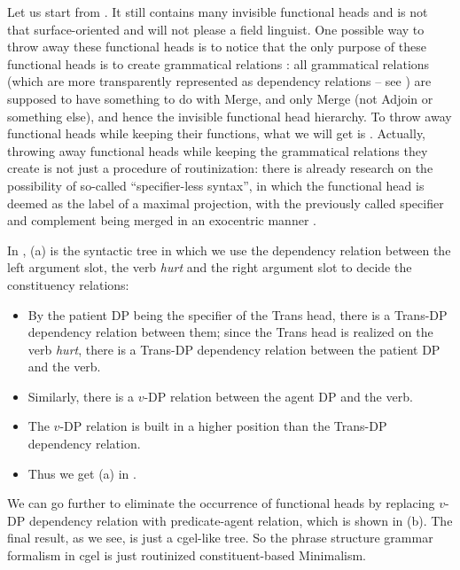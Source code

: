 \documentclass[../main.tex]{subfiles}
\begin{document}
Let us start from . 
It still contains many invisible functional heads 
and is not that surface-oriented and will not please a field linguist. 
One possible way to throw away these functional heads is to notice that 
the only purpose of these functional heads is to create grammatical relations \citep{hornstein2021extended}: 
all grammatical relations (which are more transparently represented as dependency relations 
-- see ) are supposed to have something to do with Merge, 
and only Merge (not Adjoin or something else), and hence the invisible functional head hierarchy.
To throw away functional heads while keeping their functions, 
what we will get is . 
Actually, throwing away functional heads while keeping the grammatical relations they create 
is not just a procedure of routinization: 
there is already research on the possibility of so-called ``specifier-less syntax'',
in which the functional head is deemed as the label of a maximal projection, 
with the previously called specifier and complement being merged in an exocentric manner \citep{osborne2011bare}.

In , (a) is the syntactic tree in which 
we use the dependency relation between the left argument slot, the verb \emph{hurt} and the right 
argument slot to decide the constituency relations:
\begin{itemize}
    \item By the patient DP being the specifier of the Trans head, there is a Trans-DP dependency relation between them; since the Trans head is realized on the verb \emph{hurt}, there is a Trans-DP dependency relation between the patient DP and the verb. %
    \item Similarly, there is a $v$-DP relation between the agent DP and the verb.
    \item The $v$-DP relation is built in a higher position than the Trans-DP dependency relation.
    \item Thus we get (a) in .
\end{itemize}
We can go further to eliminate the occurrence of functional heads by replacing $v$-DP dependency relation 
with predicate-agent relation, which is shown in (b). The final result, as we see, is just a \ac{cgel}-like 
tree. So the phrase structure grammar formalism in \ac{cgel} is just routinized constituent-based Minimalism.
\end{document}
